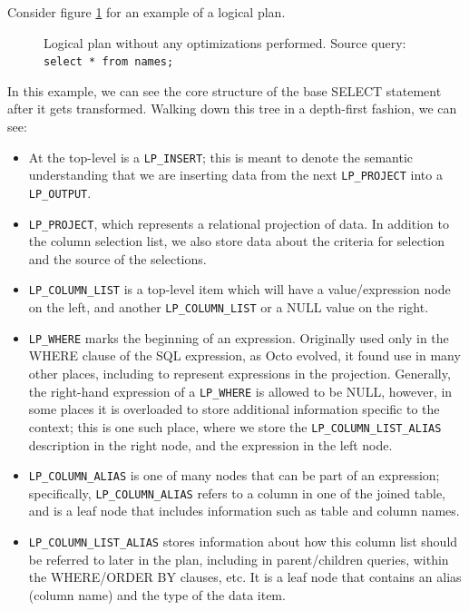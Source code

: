 \documentclass[]{article}
\def\code#1{\texttt{#1}}
\begin{document}
Consider figure \ref{fig:lp_before_optimizations} for an example of a logical plan.

\begin{figure}
	
	\caption{Logical plan without any optimizations performed. Source query: \texttt{select * from names;}}
	\label{fig:lp_before_optimizations}
\end{figure}

In this example, we can see the core structure of the base SELECT statement after it gets transformed.
Walking down this tree in a depth-first fashion, we can see:

\begin{itemize}
	\item At the top-level is a \code{LP\_INSERT}; this is meant to denote the semantic understanding that we are inserting data from the next \code{LP\_PROJECT} into a \code{LP\_OUTPUT}.
	\item \code{LP\_PROJECT}, which represents a relational projection of data. In addition to the column selection list, we also store data about the criteria for selection and the source of the selections.
	\item \code{LP\_COLUMN\_LIST} is a top-level item which will have a value/expression node on the left, and another \code{LP\_COLUMN\_LIST} or a NULL value on the right.
	\item \code{LP\_WHERE} marks the beginning of an expression. Originally used only in the WHERE clause of the SQL expression, as Octo evolved, it found use in many other places, including to represent expressions in the projection. Generally, the right-hand expression of a \code{LP\_WHERE} is allowed to be NULL, however, in some places it is overloaded to store additional information specific to the context; this is one such place, where we store the \code{LP\_COLUMN\_LIST\_ALIAS} description in the right node, and the expression in the left node.
	\item \code{LP\_COLUMN\_ALIAS} is one of many nodes that can be part of an expression; specifically, \code{LP\_COLUMN\_ALIAS} refers to a column in one of the joined table, and is a leaf node that includes information such as table and column names.
	\item \code{LP\_COLUMN\_LIST\_ALIAS} stores information about how this column list should be referred to later in the plan, including in parent/children queries, within the WHERE/ORDER BY clauses, etc. It is a leaf node that contains an alias (column name) and the type of the data item.

\end{itemize}
\end{document}
